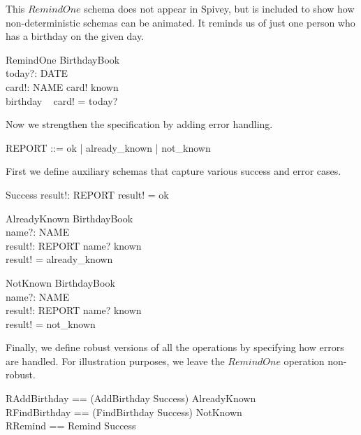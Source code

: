 \documentclass{article}
\begin{document}
This $RemindOne$ schema does not appear in Spivey, but is
included to show how non-deterministic schemas can be animated.
It reminds us of just one person who has a birthday on the given 
day.
\begin{schema}{RemindOne}
    \Xi BirthdayBook \\
    today?: DATE \\
    card!: NAME
\where
    card! \in known \\
    birthday ~ card! = today?
\end{schema}


Now we strengthen the specification by adding error handling.

\begin{zed} 
    REPORT ::= ok | already\_known | not\_known
\end{zed}

First we define auxiliary schemas that capture various success
and error cases.

\begin{schema}{Success}
    result!: REPORT
\where
    result! = ok
\end{schema}

\begin{schema}{AlreadyKnown}
    \Xi BirthdayBook \\
    name?: NAME \\
    result!: REPORT
\where
    name? \in known \\
    result! = already\_known
\end{schema}


\begin{schema}{NotKnown}
    \Xi BirthdayBook \\
    name?: NAME \\
    result!: REPORT
\where
    name? \notin known \\
    result! = not\_known
\end{schema}

Finally, we define robust versions of all the operations
by specifying how errors are handled.  
For illustration purposes, we leave the $RemindOne$ operation non-robust.

\begin{zed} 
    RAddBirthday == (AddBirthday \land Success) \lor AlreadyKnown \\
    RFindBirthday == (FindBirthday \land Success) \lor NotKnown \\
    RRemind == Remind \land Success
\end{zed}
\end{document}
